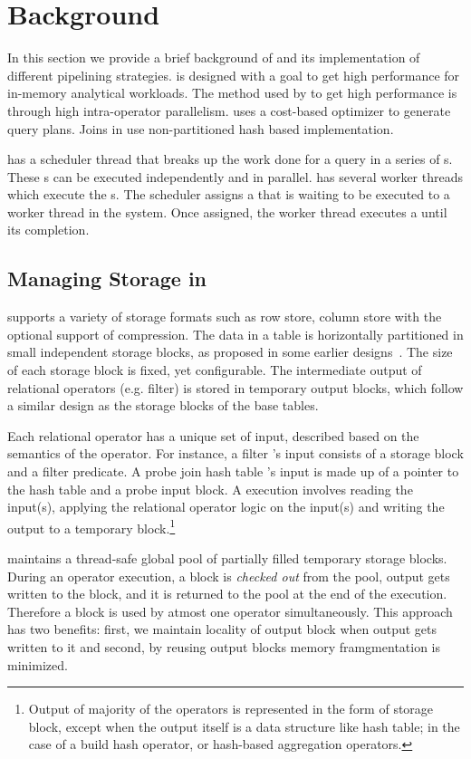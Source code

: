 \section{\SYS{} Background}\label{sec:sys-background}
In this section we provide a brief background of \sys{} and its implementation of different pipelining strategies. 
\sys{} is designed with a goal to get high performance for in-memory analytical workloads.
The method used by \sys{} to get high performance is through high intra-operator parallelism. 
\sys{} uses a cost-based optimizer to generate query plans. 
Joins in \sys{} use non-partitioned hash based implementation. 

\sys{} has a scheduler thread that breaks up the work done for a query in a series of \wo{}s.
These \wo{}s can be executed independently and in parallel.
\sys{} has several worker threads which execute the \wo{}s.
The scheduler assigns a \wo{} that is waiting to be executed to a worker thread in the system. 
Once assigned, the worker thread executes a \wo{} until its completion. 

\subsection{Managing Storage in \sys{}}
\sys{} supports a variety of storage formats such as row store, column store with the optional support of compression. 
The data in a table is horizontally partitioned in small independent storage blocks, as proposed in some earlier designs~\cite{quickstep-storage, quickstep-system}. 
The size of each storage block is fixed, yet configurable.
The intermediate output of relational operators (e.g. filter) is stored in temporary output blocks, which follow a similar design as the storage blocks of the base tables. 

Each relational operator \wo{} has a unique set of input, described based on the semantics of the operator.
For instance, a filter \wo{}'s input consists of a storage block and a filter predicate.
A probe join hash table \wo{}'s input is made up of a pointer to the hash table and a probe input block.
A \wo{} execution involves reading the input(s), applying the relational operator logic on the input(s) and writing the output to a temporary block.\footnote{Output of majority of the operators is represented in the form of storage block, except when the output itself is a data structure like hash table; in the case of a build hash operator, or hash-based aggregation operators.}

\sys{} maintains a thread-safe global pool of partially filled temporary storage blocks.
During an operator \wo{} execution, a block is \textit{checked out} from the pool, output gets written to the block, and it is returned to the pool at the end of the execution. 
Therefore a block is used by atmost one operator \wo{} simultaneously. 
This approach has two benefits: first, we maintain locality of output block when output gets written to it and second, by reusing output blocks memory framgmentation is minimized. 

